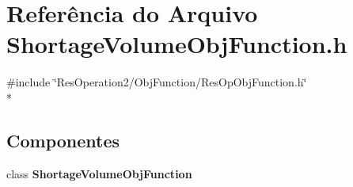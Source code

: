 \section{Referência do Arquivo Shortage\+Volume\+Obj\+Function.\+h}
\label{_2_obj_function_2_shortage_volume_2_shortage_volume_obj_function_8h}
{\ttfamily \#include \char`\"{}Res\+Operation2/\+Obj\+Function/\+Res\+Op\+Obj\+Function.\+h\char`\"{}}\\*
\subsection*{Componentes}
\begin{DoxyCompactItemize}
\item 
class {\bf Shortage\+Volume\+Obj\+Function}
\end{DoxyCompactItemize}
